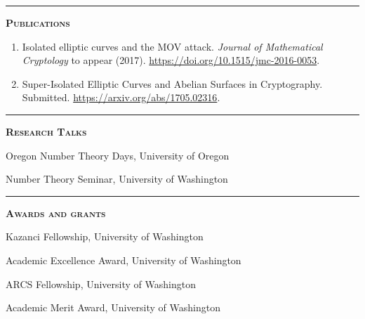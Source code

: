 \documentclass[12pt]{article}
\newcommand{\sectionheading}[1]
{
\bigskip %
\noindent
\hspace{-6.5mm}\textcolor{Gray}{\rule[.75mm]{21.5mm}{1mm}} %
\hspace{.2mm}	%
{\large{\textbf{\textsc{#1}}}} %
}
\newenvironment{date_section}
	{
	\vspace{-1ex}
	\leftmargini = 15ex
		\begin{itemize}[
			labelsep = *,
			labelwidth = 9ex,
			labelindent = 0ex,
			itemindent = !,
			font=\normalfont,
			align=parleft
		]{}
		\itemsep=-1.5mm
	}
	{\end{itemize}\vspace{-2ex}}
\newcommand{\yearmo}[2]{
	\item[
		{\makebox[1ex][r]{#1}}
		\hspace{1ex}
		{\makebox[1ex][l]{#2} }
		] }
\begin{document}
	\sectionheading{Publications}%
	
	\begin{enumerate}[itemsep=-1mm, leftmargin=24mm]
		
		\item
		{Isolated elliptic curves and the MOV attack.}
		\textit{Journal of Mathematical Cryptology} to appear (2017). \url{https://doi.org/10.1515/jmc-2016-0053}.
		
		\item
		{Super-Isolated Elliptic Curves and Abelian Surfaces in Cryptography.}
		Submitted.
		\url{https://arxiv.org/abs/1705.02316}.
		
	\end{enumerate}

	\sectionheading{Research Talks} %
	
	\begin{date_section}
		
		\yearmo{2017}{Oct.} %
		Oregon Number Theory Days,
		University of Oregon
		
		\yearmo{2017}{May.} %
		Number Theory Seminar,
		University of Washington
		
	\end{date_section}


	\sectionheading{Awards and grants}%
	
	\begin{date_section}
		\yearmo{}{2017}%
		Kazanci Fellowship, University of Washington
		\yearmo{}{2014}%
		Academic Excellence Award, University of Washington
		\yearmo{}{2013}%
		ARCS Fellowship, University of Washington
		\yearmo{}{2013}%
		Academic Merit Award, University of Washington
	\end{date_section}
\end{document}
